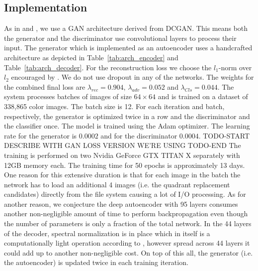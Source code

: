 \documentclass[12pt,a4paper]{article}
\begin{document}
\subsection{Implementation}
As in \cite{DisentFacOfVarByMixTh} and \cite{InfoGAN}, we use a GAN architecture derived from DCGAN. This means both the generator and the discriminator use convolutional layers to process their input. The generator which is implemented as an autoencoder uses a handcrafted architecture as depicted in Table~\ref{tab:arch_encoder} and Table~\ref{tab:arch_decoder}. For the reconstruction loss we choose the $l_1$-norm over $l_2$ encouraged by \cite{CondGAN_PatchGAN}. We do not use dropout in any of the networks. The weights for the combined final loss are $ \lambda_{rec} = 0.904$, $\lambda_{adv} = 0.052$ and $ \lambda_{Cls} = 0.044$. The system processes batches of images of size $64 \times 64$ and is trained on a dataset of 338,865 color images. The batch size is 12. For each iteration and batch, respectively, the generator is optimized twice in a row and the discriminator and the classifier once. The model is trained using the Adam optimizer. The learning rate for the generator is $0.0002$ and for the discriminator $0.0004$. TODO-START DESCRIBE WITH GAN LOSS VERSION WE'RE USING TODO-END The training is performed on two Nvidia GeForce GTX TITAN X separately with 12GB memory each. The training time for 50 epochs is approximately 13 days. One reason for this extensive duration is that for each image in the batch the network has to load an additional 4 images (i.e. the quadrant replacement candidates) directly from the file system causing a lot of I/O processing. As for another reason, we conjecture the deep autoencoder with 95 layers consumes another non-negligible amount of time to perform backpropagation even though the number of parameters is only a fraction of the total network. In the 44 layers of the decoder, spectral normalization is in place which in itself is a computationally light operation according to \cite{SNGAN}, however spread across 44 layers it could add up to another non-negligible cost. On top of this all, the generator (i.e. the autoencoder) is updated twice in each training iteration.

\end{document}
